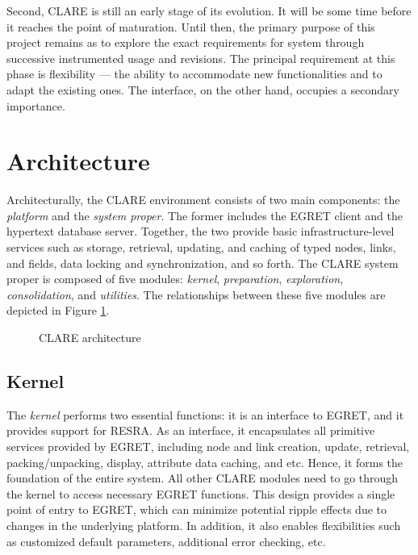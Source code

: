 Second, CLARE is still an early stage of its evolution. It will be some
time before it reaches the point of maturation. Until then, the primary
purpose of this project remains as to explore the exact requirements for
system through successive instrumented usage and revisions. The principal
requirement at this phase is flexibility --- the ability to accommodate new
functionalities and to adapt the existing ones. The interface, on the other
hand, occupies a secondary importance.


\section{Architecture}
\label{sec:architecture}

Architecturally, the CLARE environment consists of two main components: the
{\it platform\/} and the {\it system proper\/}. The former includes the
EGRET client and the hypertext database server. Together, the two provide
basic infrastructure-level services such as storage, retrieval, updating,
and caching of typed nodes, links, and fields, data locking and
synchronization, and so forth. The CLARE system proper is composed of five
modules: {\it kernel\/}, {\it preparation\/}, {\it exploration\/}, {\it
consolidation\/}, and {\it utilities\/}. The relationships between these
five modules are depicted in Figure \ref{fig:arch}.

\begin{figure}[htb]
  \caption{CLARE architecture}
  \label{fig:arch}
\end{figure}


\subsection{Kernel}
\label{sec:kernel}

The {\it kernel\/} performs two essential functions: it is an interface to
EGRET, and it provides support for RESRA. As an interface, it encapsulates
all primitive services provided by EGRET, including node and link creation,
update, retrieval, packing/unpacking, display, attribute data caching, and
etc. Hence, it forms the foundation of the entire system. All other CLARE
modules need to go through the kernel to access necessary EGRET
functions. This design provides a single point of entry to EGRET, which can
minimize potential ripple effects due to changes in the underlying
platform. In addition, it also enables flexibilities such as customized
default parameters, additional error checking, etc.

